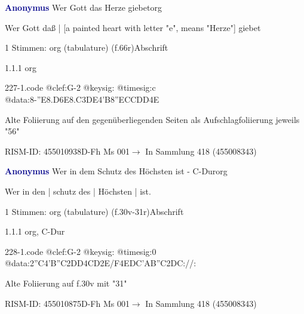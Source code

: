 \documentclass[twocolumn, 12pt]{book}
\begin{document}
\par \vspace{16pt} \textcolor{darkblue}{\textbf{Anonymus  }}\hfillplus{\textbf{[227]}}\newline Wer Gott das Herze giebet\newline org
\par \begin{itshape}[f.66r, at left:] Wer Gott daß | [a painted heart with letter "e", means "Herze"] giebet\end{itshape} 
\par \textcolor{darkblue}{}  1 Stimmen: org (tabulature)  (f.66r)\newline Abschrift
\par 1.1.1  org  
\begin{filecontents*}{227-1.code}
@clef:G-2
@keysig:
@timesig:c
@data:8-{''E8.D6E}{8.C3DE}4'B{8''ECC}{DD}4E
\end{filecontents*}
\newline %
\par Alte Foliierung auf den gegenüberliegenden Seiten als Aufschlagfoliierung jeweils "56"
\par RISM-ID: 455010938\newline D-Fh  Ms 001\newline $\rightarrow$ In Sammlung 418 (455008343)
      
\par \vspace{16pt} \textcolor{darkblue}{\textbf{Anonymus  }}\hfillplus{\textbf{[228]}}\newline Wer in dem Schutz des Höchsten ist - C-Dur\newline org
\par \begin{itshape}[f.30v, at left:] Wer in den | schutz des | Höchsten | ist.\end{itshape} 
\par \textcolor{darkblue}{}  1 Stimmen: org (tabulature)  (f.30v-31r)\newline Abschrift
\par 1.1.1  org, C-Dur  
\begin{filecontents*}{228-1.code}
@clef:G-2
@keysig:
@timesig:0
@data:2''C4'B''C2DD4CD2E/F4EDC'AB''C2DC://:
\end{filecontents*}
\newline %
\par Alte Foliierung auf f.30v mit "31"
\par RISM-ID: 455010875\newline D-Fh  Ms 001\newline $\rightarrow$ In Sammlung 418 (455008343)
      
\end{document}
